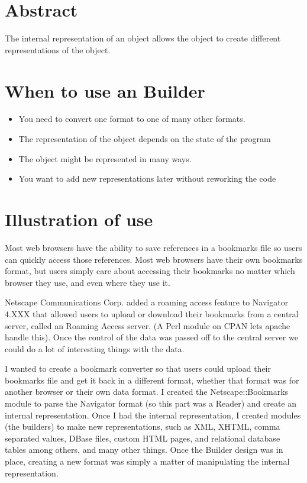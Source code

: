 
    \section{Abstract}

The internal representation of an object allows the object
to create different representations of the object.

    \section{When to use an Builder}
    
\begin{itemize}
\item You need to convert one format to one of many other formats.
\item The representation of the object depends on the state
of the program
\item The object might be represented in many ways.
\item You want to add new representations later without reworking
the code
\end{itemize}

	\section{Illustration of use}
	
Most web browsers have the ability to save references in a bookmarks
file so users can quickly access those references.  Most web browsers
have their own bookmarks format, but users simply care about accessing
their bookmarks no matter which browser they use, and even where
they use it.

Netscape Communications Corp. added a roaming access feature to
Navigator 4.XXX that allowed users to upload or download their bookmarks
from a central server, called an Roaming Access server. (A Perl
module on CPAN lets apache handle this).  Once the control of the 
data was passed off to the central server we could do a lot of
interesting things with the data.

I wanted to create a bookmark converter so that users could 
upload their bookmarks file and get it back in a different
format, whether that format was for another browser or their
own data format.  I created the Netscape::Bookmarks module
to parse the Navigator format (so this part was a Reader)
and create an internal representation.  Once I had the internal
representation, I created modules (the builders) to make 
new representations, such as XML, XHTML, comma separated values,
DBase files, custom HTML pages, and
relational database tables among others, and many other things.  Once the
Builder design was in place, creating a new format was simply a
matter of manipulating the internal representation.  

